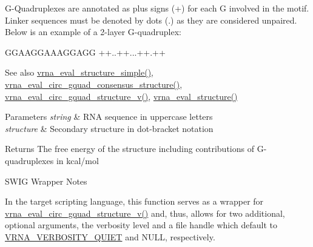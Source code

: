 G-\/\+Quadruplexes are annotated as plus signs (\textquotesingle{}+\textquotesingle{}) for each G involved in the motif. Linker sequences must be denoted by dots (\textquotesingle{}.\textquotesingle{}) as they are considered unpaired. Below is an example of a 2-\/layer G-\/quadruplex\+: 
\begin{DoxyCode}
GGAAGGAAAGGAGG
++..++...++.++
\end{DoxyCode}


\begin{DoxySeeAlso}{See also}
\hyperlink{group__eval_ga7e5273464b775d4130245681312c1369}{vrna\+\_\+eval\+\_\+structure\+\_\+simple()}, \hyperlink{group__eval_gac673ebb9ae2a29f54d201e2ac5b85540}{vrna\+\_\+eval\+\_\+circ\+\_\+gquad\+\_\+consensus\+\_\+structure()}, \hyperlink{group__eval_gab96a6c59923ff06c35f8c2fd2c239727}{vrna\+\_\+eval\+\_\+circ\+\_\+gquad\+\_\+structure\+\_\+v()}, \hyperlink{group__eval_ga58f199f1438d794a265f3b27fc8ea631}{vrna\+\_\+eval\+\_\+structure()}
\end{DoxySeeAlso}

\begin{DoxyParams}{Parameters}
{\em string} & R\+NA sequence in uppercase letters \\
\hline
{\em structure} & Secondary structure in dot-\/bracket notation \\
\hline
\end{DoxyParams}
\begin{DoxyReturn}{Returns}
The free energy of the structure including contributions of G-\/quadruplexes in kcal/mol
\end{DoxyReturn}
\begin{DoxyRefDesc}{S\+W\+I\+G Wrapper Notes}
\item[\hyperlink{wrappers__wrappers000044}{S\+W\+I\+G Wrapper Notes}]In the target scripting language, this function serves as a wrapper for \hyperlink{group__eval_gab96a6c59923ff06c35f8c2fd2c239727}{vrna\+\_\+eval\+\_\+circ\+\_\+gquad\+\_\+structure\+\_\+v()} and, thus, allows for two additional, optional arguments, the verbosity level and a file handle which default to \hyperlink{group__eval_gaf4afe19780b61b4962c613bde324128b}{V\+R\+N\+A\+\_\+\+V\+E\+R\+B\+O\+S\+I\+T\+Y\+\_\+\+Q\+U\+I\+ET} and N\+U\+LL, respectively. \end{DoxyRefDesc}
\mbox{\label{group__eval_gaf928bfd96767e1b8033a95a4cc432e39}} 
